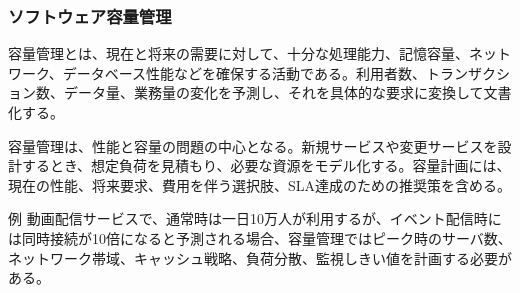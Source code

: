 \subsubsection{ソフトウェア容量管理}

容量管理とは、現在と将来の需要に対して、十分な処理能力、記憶容量、ネットワーク、データベース性能などを確保する活動である。利用者数、トランザクション数、データ量、業務量の変化を予測し、それを具体的な要求に変換して文書化する。

容量管理は、性能と容量の問題の中心となる。新規サービスや変更サービスを設計するとき、想定負荷を見積もり、必要な資源をモデル化する。容量計画には、現在の性能、将来要求、費用を伴う選択肢、SLA達成のための推奨策を含める。

\begin{pointbox}{例}
動画配信サービスで、通常時は一日10万人が利用するが、イベント配信時には同時接続が10倍になると予測される場合、容量管理ではピーク時のサーバ数、ネットワーク帯域、キャッシュ戦略、負荷分散、監視しきい値を計画する必要がある。
\end{pointbox}
